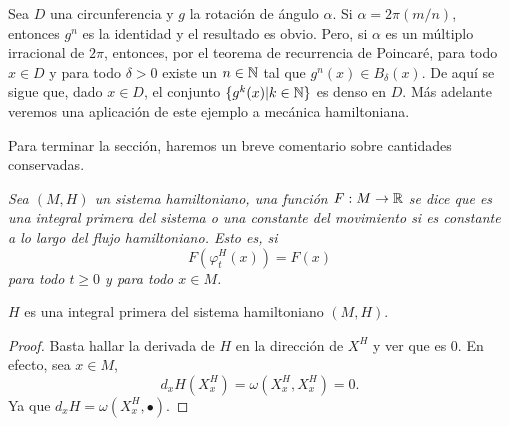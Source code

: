 \begin{ejemplo}
  Sea $D$ una circunferencia y $g$ la rotación de ángulo $\alpha$. Si $\alpha=2\pi(m/n)$, entonces $g^n$ es la identidad y el resultado es obvio. Pero, si $\alpha$ es un múltiplo irracional de $2\pi$, entonces, por el teorema de recurrencia de Poincaré, para todo $x\in D$ y para todo $\delta>0$ existe un $n\in \mathbb{N}$ tal que $g^n(x) \in B_{\delta}(x)$.
  De aquí se sigue que, dado $x \in D$, el conjunto $\{g^k(x)|k\in \mathbb{N}\}$ es denso en $D$. Más adelante veremos una aplicación de este ejemplo a mecánica hamiltoniana.

\end{ejemplo}

Para terminar la sección, haremos un breve comentario sobre cantidades conservadas.
\begin{defn}
  \em
  Sea $(M,H)$ un sistema hamiltoniano, una función $F:M \rightarrow \mathbb{R}$ se dice que es una \emph{integral primera} del sistema o una \emph{constante del movimiento} si es constante a lo largo del flujo hamiltoniano. Esto es, si
  \begin{equation*}
    F(\varphi^H_t(x))=F(x)
  \end{equation*}
  para todo $t \geq 0$ y para todo $x \in M$.
  \begin{prop}
    $H$ es una integral primera del sistema hamiltoniano $(M,H)$.
  \end{prop}
  \begin{proof}
    Basta hallar la derivada de $H$ en la dirección de $X^H$ y ver que es 0. En efecto, sea $x \in M$,
    \begin{equation*}
      d_xH(X_x^H) = \omega(X_x^H,X_x^H)=0.
    \end{equation*}
    Ya que $d_xH=\omega(X_x^H,\bullet)$.
  \end{proof}
\end{defn}

